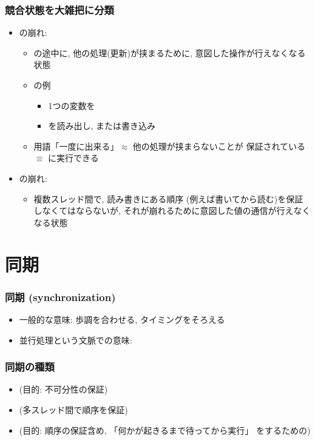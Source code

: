 \documentclass[12pt,dvipdfmx]{beamer}
\begin{document}
\begin{frame}
  \frametitle{競合状態を大雑把に分類}
  \begin{itemize}
  \item {}の崩れ:
    \begin{itemize}
    \item {}の途中に,
      他の処理(更新)が挟まるために, 意図した操作が行えなくなる状態
    \item {}の例
      \begin{itemize}
      \item 1つの変数を
      \item {}を読み出し, または書き込み
      \end{itemize}
    \item 用語「一度に出来る」$\approx$ 他の処理が挟まらないことが
      保証されている $\equiv$ に実行できる
    \end{itemize}
    
  \item {}の崩れ:
    \begin{itemize}
    \item 複数スレッド間で, 読み書きにある順序
      (例えば書いてから読む)を保証しなくてはならないが,
      それが崩れるために意図した値の通信が行えなくなる状態
    \end{itemize}    
  \end{itemize}
\end{frame}

\section{同期}
\begin{frame}
  \frametitle{同期 (synchronization)}
  \begin{itemize}
  \item 一般的な意味: 歩調を合わせる, タイミングをそろえる
  \item 並行処理という文脈での意味:
  \end{itemize}
\end{frame}

\begin{frame}
  \frametitle{同期の種類}
  \begin{itemize}
  \item {} (目的: 不可分性の保証)
  \item {} (多スレッド間で順序を保証)
  \item {} (目的:
    順序の保証含め, 「何かが起きるまで待ってから実行」
    をするための)
  \end{itemize}
\end{frame}
\end{document}
